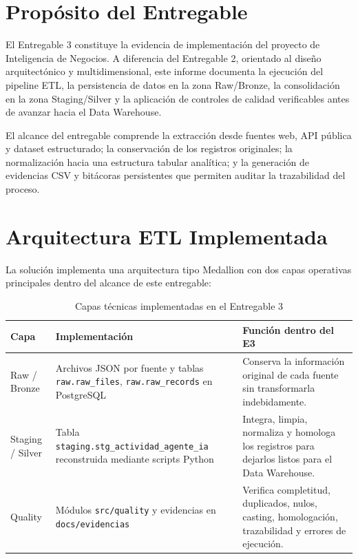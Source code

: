 \documentclass[12pt,a4paper]{article}
\newcommand{\StagingTabla}{\texttt{staging.stg\_actividad\_agente\_ia}}
\newcommand{\pathcode}[1]{\begingroup\footnotesize\ttfamily\nolinkurl{#1}\endgroup}
\begin{document}
\tableofcontents
\newpage

\section{Prop\'osito del Entregable}

El Entregable 3 constituye la evidencia de implementaci\'on del proyecto de Inteligencia de Negocios. A diferencia del Entregable 2, orientado al dise\~no arquitect\'onico y multidimensional, este informe documenta la ejecuci\'on del pipeline ETL, la persistencia de datos en la zona Raw/Bronze, la consolidaci\'on en la zona Staging/Silver y la aplicaci\'on de controles de calidad verificables antes de avanzar hacia el Data Warehouse.

El alcance del entregable comprende la extracci\'on desde fuentes web, API p\'ublica y dataset estructurado; la conservaci\'on de los registros originales; la normalizaci\'on hacia una estructura tabular anal\'itica; y la generaci\'on de evidencias CSV y bit\'acoras persistentes que permiten auditar la trazabilidad del proceso.

\section{Arquitectura ETL Implementada}

La soluci\'on implementa una arquitectura tipo Medallion con dos capas operativas principales dentro del alcance de este entregable:

\begin{table}[H]
\centering
\footnotesize
{}
\begin{tabular}{|P{3cm}|P{5.1cm}|P{5.5cm}|}
\hline
{}
\textbf{Capa} & \textbf{Implementaci\'on} & \textbf{Funci\'on dentro del E3} \\ \hline
Raw / Bronze & Archivos JSON por fuente y tablas \pathcode{raw.raw_files}, \pathcode{raw.raw_records} en PostgreSQL & Conserva la informaci\'on original de cada fuente sin transformarla indebidamente. \\ \hline
Staging / Silver & Tabla \StagingTabla{} reconstruida mediante scripts Python & Integra, limpia, normaliza y homologa los registros para dejarlos listos para el Data Warehouse. \\ \hline
Quality & M\'odulos \pathcode{src/quality} y evidencias en \pathcode{docs/evidencias} & Verifica completitud, duplicados, nulos, casting, homologaci\'on, trazabilidad y errores de ejecuci\'on. \\ \hline
\end{tabular}
\caption{Capas t\'ecnicas implementadas en el Entregable 3}
\end{table}
\end{document}
